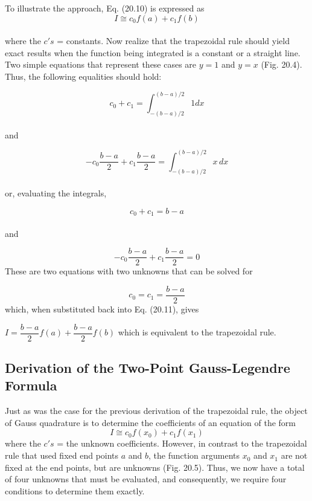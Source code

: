 \documentclass[../main.tex]{subfiles}
\begin{document}
To illustrate the approach, Eq. (20.10) is expressed as
\begin{equation}
	\tag{20.11}
	I\cong c_0 f(a) + c_1 f(b)
\end{equation}\\
where the $c's$ = constants. Now realize that the trapezoidal rule should yield exact results
when the function being integrated is a constant or a straight line. Two simple equations
that represent these cases are $y = 1$ and $y = x$ (Fig. 20.4). Thus, the following equalities
should hold:

	$$c_0 + c_1 = \int^{(b-a)/2}_{-(b-a)/2} 1dx$$\\
and

	$$-c_0 \dfrac{b-a}{2}+c_1 \dfrac{b-a}{2} = \int^{(b-a)/2}_{-(b-a)/2} x\, dx$$\\
or, evaluating the integrals,

	$$c_0 + c_1 = b-a$$\\
and

	$$-c_0 \dfrac{b-a}{2} + c_1 \dfrac{b-a}{2} = 0$$
These are two equations with two unknowns that can be solved for

	$$c_0= c_1 = \dfrac{b-a}{2}$$
which, when substituted back into Eq. (20.11), gives

	$I= \dfrac{b-a}{2} f(a) + \dfrac{b-a}{2} f(b)$
which is equivalent to the trapezoidal rule.
\subsection{Derivation of the Two-Point Gauss-Legendre Formula}
Just as was the case for the previous derivation of the trapezoidal rule, the object of Gauss
quadrature is to determine the coefficients of an equation of the form
\vspace{0.1 in}
\begin{equation}
	\tag{20.12}
	I\cong c_0 f(x_0)+c_1 f(x_1)
\end{equation}
where the $c's$ = the unknown coefficients. However, in contrast to the trapezoidal rule that
used fixed end points $a$ and $b$, the function arguments $x_0$ and $x_1$ are not fixed at the end
points, but are unknowns (Fig. 20.5). Thus, we now have a total of four unknowns that
must be evaluated, and consequently, we require four conditions to determine them exactly.
\end{document}
